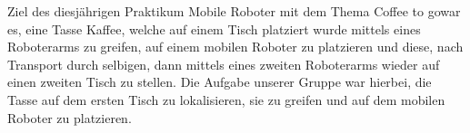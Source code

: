 Ziel des diesjährigen Praktikum Mobile Roboter mit dem Thema \glqq Coffee to go\grqq war es, eine Tasse Kaffee,  welche auf einem Tisch platziert wurde mittels eines Roboterarms zu greifen, auf einem mobilen Roboter zu platzieren und diese, nach Transport durch selbigen, dann mittels eines zweiten Roboterarms wieder auf einen zweiten Tisch zu stellen.
Die Aufgabe unserer Gruppe war hierbei, die Tasse auf dem ersten Tisch zu lokalisieren, sie zu greifen und auf dem mobilen Roboter zu platzieren.